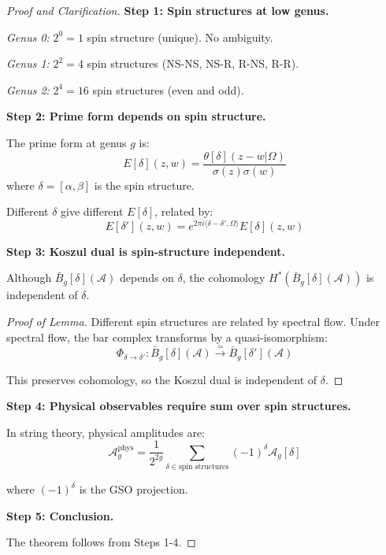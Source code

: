 \begin{proof}[Proof and Clarification]

\textbf{Step 1: Spin structures at low genus.}

\textit{Genus 0:} $2^0 = 1$ spin structure (unique). No ambiguity.

\textit{Genus 1:} $2^2 = 4$ spin structures (NS-NS, NS-R, R-NS, R-R).

\textit{Genus 2:} $2^4 = 16$ spin structures (even and odd).

\textbf{Step 2: Prime form depends on spin structure.}

The prime form at genus $g$ is:
$$E[\delta](z,w) = \frac{\theta[\delta](z-w|\Omega)}{\sigma(z)\sigma(w)}$$
where $\delta = [\alpha, \beta]$ is the spin structure.

Different $\delta$ give different $E[\delta]$, related by:
$$E[\delta'](z,w) = e^{2\pi i \langle \delta - \delta', \Omega \rangle} E[\delta](z,w)$$

\textbf{Step 3: Koszul dual is spin-structure independent.}

\begin{lemma}\label{lem:spin-independence}
Although $\bar{B}_g[\delta](\mathcal{A})$ depends on $\delta$, the cohomology 
$H^*(\bar{B}_g[\delta](\mathcal{A}))$ is independent of $\delta$.
\end{lemma}

\begin{proof}[Proof of Lemma]
Different spin structures are related by spectral flow. 
Under spectral flow, the bar complex transforms by a quasi-isomorphism:
$$\Phi_{\delta \to \delta'}: \bar{B}_g[\delta](\mathcal{A}) \xrightarrow{\simeq} 
\bar{B}_g[\delta'](\mathcal{A})$$

This preserves cohomology, so the Koszul dual is independent of $\delta$.
\end{proof}

\textbf{Step 4: Physical observables require sum over spin structures.}

In string theory, physical amplitudes are:
$$\mathcal{A}^{\text{phys}}_g = \frac{1}{2^{2g}} \sum_{\delta \in \text{spin structures}} 
(-1)^{\delta} \mathcal{A}_g[\delta]$$

where $(-1)^{\delta}$ is the GSO projection.

\textbf{Step 5: Conclusion.}

The theorem follows from Steps 1-4.

\end{proof}

